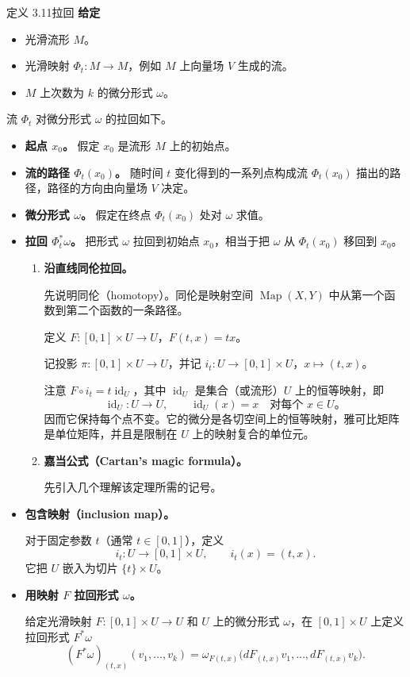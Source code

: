 \begin{statement}{定义 3.11}{拉回}
\noindent\textbf{给定}
\begin{itemize}
\item 光滑流形 $M$。
\item 光滑映射 $\Phi_t\colon M\to M$，例如 $M$ 上向量场 $V$ 生成的流。
\item $M$ 上次数为 $k$ 的微分形式 $\omega$。
\end{itemize}
流 $\Phi_t$ 对微分形式 $\omega$ 的拉回如下。
\begin{itemize}
\item \textbf{起点 $x_0$。} 假定 $x_0$ 是流形 $M$ 上的初始点。
\item \textbf{流的路径 $\Phi_t(x_0)$。} 随时间 $t$ 变化得到的一系列点构成流 $\Phi_t(x_0)$ 描出的路径，路径的方向由向量场 $V$ 决定。
\item \textbf{微分形式 $\omega$。} 假定在终点 $\Phi_t(x_0)$ 处对 $\omega$ 求值。
\item \textbf{拉回 $\Phi_t^*\omega$。} 把形式 $\omega$ 拉回到初始点 $x_0$，相当于把 $\omega$ 从 $\Phi_t(x_0)$ 移回到 $x_0$。
\begin{enumerate}
\item \textbf{沿直线同伦拉回。}

先说明同伦（homotopy）。同伦是映射空间 $\operatorname{Map}(X,Y)$ 中从第一个函数到第二个函数的一条路径。

定义 $F\colon[0,1]\times U\to U$，$F(t,x)=tx$。

记投影 $\pi\colon[0,1]\times U\to U$，并记 $i_t\colon U\to[0,1]\times U$，$x\mapsto(t,x)$。

注意 $F\circ i_t=t\operatorname{id}_U$，其中 $\operatorname{id}_U$ 是集合（或流形）$U$ 上的恒等映射，即
\[
  \operatorname{id}_U\colon U\to U,\qquad
  \operatorname{id}_U(x)=x\quad\text{对每个 $x\in U$。}
\]
因而它保持每个点不变。它的微分是各切空间上的恒等映射，雅可比矩阵是单位矩阵，并且是限制在 $U$ 上的映射复合的单位元。
\item \textbf{嘉当公式（Cartan's magic formula）。}%

先引入几个理解该定理所需的记号。
\end{enumerate}
\item \textbf{包含映射（inclusion map）。}

对于固定参数 $t$（通常 $t\in[0,1]$），定义
\[
  i_t\colon U\to[0,1]\times U,\qquad i_t(x)=(t,x).
\]
它把 $U$ 嵌入为切片 $\{t\}\times U$。
\item \textbf{用映射 $F$ 拉回形式 $\omega$。}

给定光滑映射 $F\colon[0,1]\times U\to U$ 和 $U$ 上的微分形式 $\omega$，在 $[0,1]\times U$ 上定义拉回形式 $F^*\omega$
\[
  (F^*\omega)_{(t,x)}(v_1,\dots,v_k)
    =\omega_{F(t,x)}\bigl(dF_{(t,x)}v_1,\dots,dF_{(t,x)}v_k\bigr).
\]
\end{itemize}
\end{statement}

